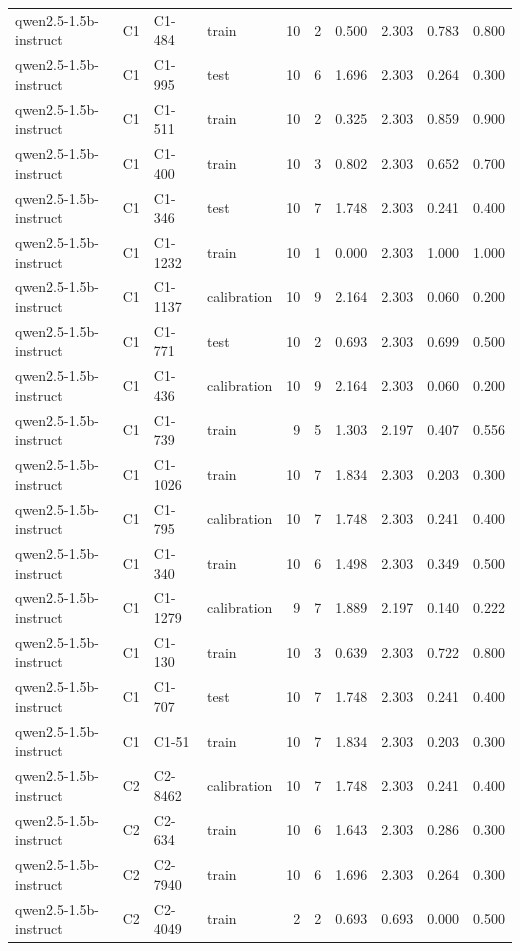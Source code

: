 \begin{table}
\begin{tabular}{llllrrrrrr}
qwen2.5-1.5b-instruct & C1 & C1-484 & train & 10 & 2 & 0.500 & 2.303 & 0.783 & 0.800 \\
qwen2.5-1.5b-instruct & C1 & C1-995 & test & 10 & 6 & 1.696 & 2.303 & 0.264 & 0.300 \\
qwen2.5-1.5b-instruct & C1 & C1-511 & train & 10 & 2 & 0.325 & 2.303 & 0.859 & 0.900 \\
qwen2.5-1.5b-instruct & C1 & C1-400 & train & 10 & 3 & 0.802 & 2.303 & 0.652 & 0.700 \\
qwen2.5-1.5b-instruct & C1 & C1-346 & test & 10 & 7 & 1.748 & 2.303 & 0.241 & 0.400 \\
qwen2.5-1.5b-instruct & C1 & C1-1232 & train & 10 & 1 & 0.000 & 2.303 & 1.000 & 1.000 \\
qwen2.5-1.5b-instruct & C1 & C1-1137 & calibration & 10 & 9 & 2.164 & 2.303 & 0.060 & 0.200 \\
qwen2.5-1.5b-instruct & C1 & C1-771 & test & 10 & 2 & 0.693 & 2.303 & 0.699 & 0.500 \\
qwen2.5-1.5b-instruct & C1 & C1-436 & calibration & 10 & 9 & 2.164 & 2.303 & 0.060 & 0.200 \\
qwen2.5-1.5b-instruct & C1 & C1-739 & train & 9 & 5 & 1.303 & 2.197 & 0.407 & 0.556 \\
qwen2.5-1.5b-instruct & C1 & C1-1026 & train & 10 & 7 & 1.834 & 2.303 & 0.203 & 0.300 \\
qwen2.5-1.5b-instruct & C1 & C1-795 & calibration & 10 & 7 & 1.748 & 2.303 & 0.241 & 0.400 \\
qwen2.5-1.5b-instruct & C1 & C1-340 & train & 10 & 6 & 1.498 & 2.303 & 0.349 & 0.500 \\
qwen2.5-1.5b-instruct & C1 & C1-1279 & calibration & 9 & 7 & 1.889 & 2.197 & 0.140 & 0.222 \\
qwen2.5-1.5b-instruct & C1 & C1-130 & train & 10 & 3 & 0.639 & 2.303 & 0.722 & 0.800 \\
qwen2.5-1.5b-instruct & C1 & C1-707 & test & 10 & 7 & 1.748 & 2.303 & 0.241 & 0.400 \\
qwen2.5-1.5b-instruct & C1 & C1-51 & train & 10 & 7 & 1.834 & 2.303 & 0.203 & 0.300 \\
qwen2.5-1.5b-instruct & C2 & C2-8462 & calibration & 10 & 7 & 1.748 & 2.303 & 0.241 & 0.400 \\
qwen2.5-1.5b-instruct & C2 & C2-634 & train & 10 & 6 & 1.643 & 2.303 & 0.286 & 0.300 \\
qwen2.5-1.5b-instruct & C2 & C2-7940 & train & 10 & 6 & 1.696 & 2.303 & 0.264 & 0.300 \\
qwen2.5-1.5b-instruct & C2 & C2-4049 & train & 2 & 2 & 0.693 & 0.693 & 0.000 & 0.500 \\

\end{tabular}
\end{table}
